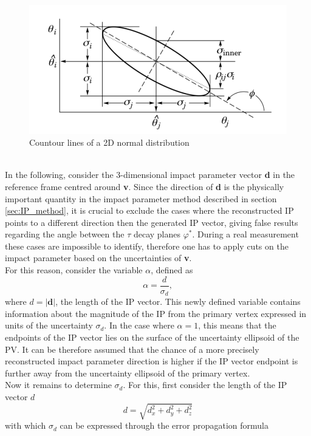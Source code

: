 \begin{figure}[h]
	\centering
	\includegraphics[width=0.7\linewidth]{Figures/ellipsoid}
	\caption{Countour lines of a 2D normal distribution \parencite{PDG_source}}
	\label{fig:ellipse}
\end{figure}\\
In the following, consider the 3-dimensional impact parameter vector \textbf{d} in the reference frame centred around \textbf{v}. Since the direction of \textbf{d} is the physically important quantity in the impact parameter method described in section \ref{sec:IP_method}, it is crucial to exclude the cases where the reconstructed IP points to a different direction then the generated IP vector, giving false results regarding the angle between the $\tau$ decay planes $\varphi^*$. During a real measurement these cases are impossible to identify, therefore one has to apply cuts on the impact parameter based on the uncertainties of \textbf{v}.\\
For this reason, consider the variable $\alpha$, defined as
\begin{equation}
	\alpha = \frac{d}{\sigma_{d}},
\end{equation}
where $d = |\boldsymbol{d}|$, the length of the IP vector. This newly defined variable contains information about the magnitude of the IP from the primary vertex expressed in units of the uncertainty $\sigma_{d}$. In the case where $\alpha = 1$, this means that the endpoints of the IP vector lies on the surface of the uncertainty ellipsoid of the PV. It can be therefore assumed that the chance of a more precisely reconstructed impact parameter direction is higher if the IP vector endpoint is further away from the uncertainty ellipsoid of the primary vertex.\\
Now it remains to determine $\sigma_{d}$. For this, first consider the length of the IP vector $d$
\begin{equation}
	d = \sqrt{d_x^2+d_y^2+d_z^2}
\end{equation}
with which $\sigma_{d}$ can be expressed through the error propagation formula \parencite{Book_error_prop}
